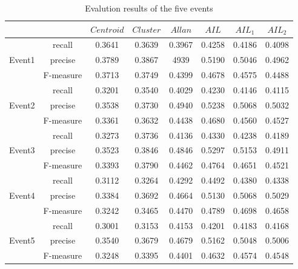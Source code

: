 \documentclass[runningheads,a4paper]{llncs}
\begin{document}
\begin{table}
\centering
\caption{Evalution results of the five events }
\begin{tabular}{c|c c c c c c c}
\hline
                  &             		& $Centroid$ & $Cluster$ & $Allan$    & $AIL$       & $AIL_1$    & $AIL_2$ \\
\hline
                 &  recall		& 0.3641     & 0.3639 & 0.3967 & 0.4258 & 0.4186 & 0.4098 \\
Event1   &  precise		& 0.3789     & 0.3867 & 4939    & 0.5190 & 0.5046 & 0.4962 \\
	       &  F-measure	& 0.3713     & 0.3749 & 0.4399 & 0.4678 & 0.4575 & 0.4488 \\
\hline
                 &  recall 		& 0.3201     & 0.3540 & 0.4029 & 0.4230 & 0.4146 & 0.4115 \\
Event2   &  precise 		& 0.3538     & 0.3730 & 0.4940 & 0.5238 & 0.5068 & 0.5032 \\
	       &  F-measure 	& 0.3361     & 0.3632 & 0.4438 & 0.4680 & 0.4560 & 0.4527 \\
\hline
                 &  recall 		& 0.3273     & 0.3736 & 0.4136 & 0.4330 & 0.4238 & 0.4189 \\
Event3   &  precise 		& 0.3523     & 0.3846 & 0.4846 & 0.5297 & 0.5153 & 0.4911 \\
	       &  F-measure 	& 0.3393     & 0.3790 & 0.4462 & 0.4764 & 0.4651 & 0.4521 \\
\hline
                 &  recall 		& 0.3112     & 0.3264 & 0.4292 & 0.4492 & 0.4380 & 0.4338 \\
Event4   &  precise 		& 0.3384     & 0.3692 & 0.4664 & 0.5130 & 0.5068 & 0.5029 \\
	       &  F-measure 	& 0.3242     & 0.3465 & 0.4470 & 0.4789 & 0.4698 & 0.4658 \\
\hline
                 &  recall 		& 0.3001     & 0.3153 & 0.4153 & 0.4201 & 0.4183 & 0.4168 \\
Event5   &  precise 		& 0.3540     & 0.3679 & 0.4679 & 0.5162 & 0.5048 & 0.5006 \\
	       &  F-measure 	& 0.3248     & 0.3395 & 0.4401 & 0.4632 & 0.4574 & 0.4548 \\
\hline
\end{tabular}
\label{evalutions}
\end{table}
\end{document}
